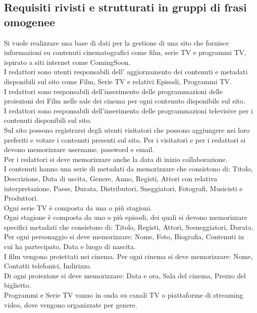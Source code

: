 \documentclass[a4paper]{article}
\begin{document}

\filbreak
\subsection{Requisiti rivisti e strutturati in gruppi di frasi omogenee}

Si vuole realizzare una base di dati per la gestione di una sito che fornisce
informazioni su contenuti cinematografici come film, serie TV e programmi TV, ispirato a siti internet come 
ComingSoon.\\
I redattori sono utenti responsabili dell' aggiornamento dei
contenuti e metadati disponibili sul sito come Film, Serie TV e relativi Episodi, Programmi TV.\\
I redattori sono responsabili dell'inserimento delle programmazioni delle proiezioni dei Film nelle sale dei
 cinema per ogni contenuto disponibile sul sito.\\
I redattori sono responsabili dell'inserimento delle programmazioni televisive per i contenuti disponibili sul sito.\\
Sul sito possono registrarsi degli utenti visitatori che possono aggiungere nei loro preferiti e votare i contenuti presenti sul sito.
Per i visitatori e per i redattori si devono memorizzare username, password e email.\\
Per i redattori si deve memorizzare anche la data di inizio collaborazione.\\
I contenuti hanno una serie di metadati da memorizzare che consistono di:
Titolo, Descrizione, Data di uscita, Genere, Anno, Registi, Attori con relativa interpretazione, 
Paese, Durata, Distributori, Sneggiatori, Fotografi, Musicisti e Produttori.\\
Ogni serie TV è composta da una o più stagioni.\\
Ogni stagione è composta da uno o più episodi, dei quali si devono memorizzare specifici metadati 
che consistono di: Titolo, Registi, Attori, Sceneggiatori, Durata.\\
Per ogni personaggio si deve memorizzare: Nome, Foto, Biografia, Contenuti in cui ha partecipato,
 Data e luogo di nascita.\\
I film vengono proiettati nei cinema. Per ogni cinema si deve memorizzare: Nome, 
Contatti telefonici, Indirizzo.\\
Di ogni proiezione si deve memorizzare: Data e ora, Sala del cinema, Prezzo del biglietto. \\
Programmi e Serie TV vanno in onda su canali TV o piattaforme di streaming video, 
dove vengono organizzate per genere.\\
\end{document}
